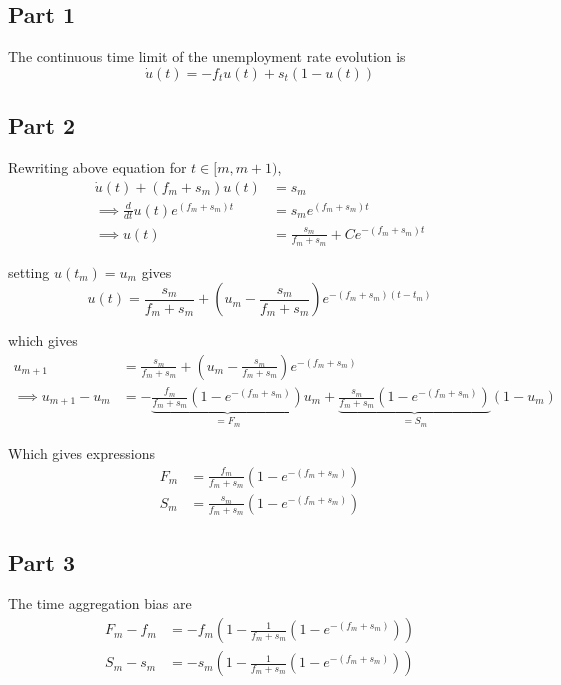 \subsection*{Part 1}
The continuous time limit of the unemployment rate evolution is 
\begin{equation}
    \dot u(t) = -f_t u(t) + s_t (1-u(t))
\end{equation}

\subsection*{Part 2}
Rewriting above equation for $t\in[m, m+1)$,
\begin{align*}
    \dot u(t) + (f_m + s_m)u(t) &= s_m\\
    \implies \frac{d }{d t}u(t)e^{(f_m + s_m)t} &= s_m e^{(f_m + s_m)t}\\
    \implies u(t) &= \frac{s_m}{f_m + s_m} + C e^{-(f_m + s_m)t}
\end{align*}

setting $u(t_m) = u_m$ gives
\begin{equation}
    u(t) = \frac{s_m}{f_m + s_m} + \left(u_m - \frac{s_m}{f_m + s_m} \right) e^{-(f_m + s_m)(t-t_m)}
\end{equation}

which gives
\begin{align*}
    u_{m+1} &=  \frac{s_m}{f_m + s_m} + \left(u_m - \frac{s_m}{f_m + s_m} \right) e^{-(f_m + s_m)}\\
    \implies u_{m+1} - u_m &= - \underbrace{\frac{f_m}{f_m + s_m} \left( 1 - e^{-(f_m + s_m)} \right)}_{=F_m} u_m + \underbrace{\frac{s_m}{f_m + s_m} \left( 1 - e^{-(f_m + s_m)} \right)}_{=S_m} (1 - u_m)
\end{align*}

Which gives expressions
\begin{align}
    F_m &= \frac{f_m}{f_m + s_m} \left( 1 - e^{-(f_m + s_m)} \right) \label{eq:q1_fm_Fm_rel}\\
    S_m &= \frac{s_m}{f_m + s_m} \left( 1 - e^{-(f_m + s_m)} \right) \label{eq:q1_sm_Sm_rel}
\end{align}

\subsection*{Part 3}
The time aggregation bias are
\begin{align*}
    F_m - f_m &= -f_m \left(1 - \frac{1}{f_m + s_m} \left( 1 - e^{-(f_m + s_m)} \right)  \right) \\
    S_m - s_m &= -s_m \left(1 - \frac{1}{f_m + s_m} \left( 1 - e^{-(f_m + s_m)} \right)  \right)
\end{align*}

